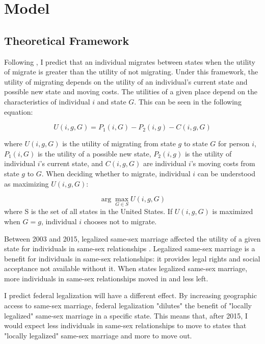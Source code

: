 \documentclass[12pt,letterpaper]{article}
\begin{document}
\section{Model}
\subsection{Theoretical Framework}
Following \citet{1, 12, 18}, I predict that an individual migrates between states when the utility of migrate is greater than the utility of not migrating. Under this framework, the utility of migrating depends on the utility of an individual's current state and possible new state and moving costs. The utilities of a given place depend on the characteristics of individual $i$ and state $G$. This can be seen in the following equation: 

\begin{equation}
U(i, g, G) = P_1(i, G) - P_2(i, g) - C(i, g, G)
\end{equation}

where $U(i, g, G)$ is the utility of migrating from state $g$ to state $G$ for person $i$, $P_1(i, G)$ is the utility of a possible new state, $P_2(i, g)$ is the utility of individual $i$'s current state, and $C(i, g, G)$ are individual $i$'s moving costs from state $g$ to $G$. When deciding whether to migrate, individual $i$ can be understood as maximizing $U(i, g, G)$:

\begin{equation}
\arg\max_{G \in S} U(i, g, G)
\end{equation}
where S is the set of all states in the United States. If $U(i, g, G)$ is maximized when $G = g$, individual $i$ chooses not to migrate.

\newline

Between 2003 and 2015, legalized same-sex marriage affected the utility of a given state for individuals in same-sex relationships \citep{1, 12}. Legalized same-sex marriage is a benefit for individuals in same-sex relationships: it provides legal rights and social acceptance not available without it. When states legalized same-sex marriage, more individuals in same-sex relationships moved in and less left. 

I predict federal legalization will have a different effect. By increasing geographic access to same-sex marriage, federal legalization "dilutes" the benefit of "locally legalized" same-sex marriage in a specific state. This means that, after 2015, I would expect less individuals in same-sex relationships to move to states that "locally legalized" same-sex marriage and more to move out.
\end{document}
